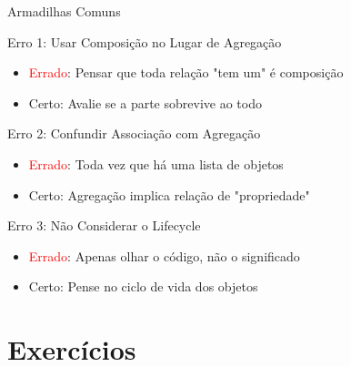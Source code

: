 \documentclass[aspectratio=169]{beamer}
\begin{document}
\begin{frame}{Armadilhas Comuns}
\begin{alertblock}{Erro 1: Usar Composição no Lugar de Agregação}
\begin{itemize}
\item \textcolor{red}{Errado}: Pensar que toda relação "tem um" é composição
\item \textcolor{green!70!black}{Certo}: Avalie se a parte sobrevive ao todo
\end{itemize}
\end{alertblock}

\begin{alertblock}{Erro 2: Confundir Associação com Agregação}
\begin{itemize}
\item \textcolor{red}{Errado}: Toda vez que há uma lista de objetos
\item \textcolor{green!70!black}{Certo}: Agregação implica relação de "propriedade"
\end{itemize}
\end{alertblock}

\begin{alertblock}{Erro 3: Não Considerar o Lifecycle}
\begin{itemize}
\item \textcolor{red}{Errado}: Apenas olhar o código, não o significado
\item \textcolor{green!70!black}{Certo}: Pense no ciclo de vida dos objetos
\end{itemize}
\end{alertblock}
\end{frame}

\section{Exercícios}
\end{document}

